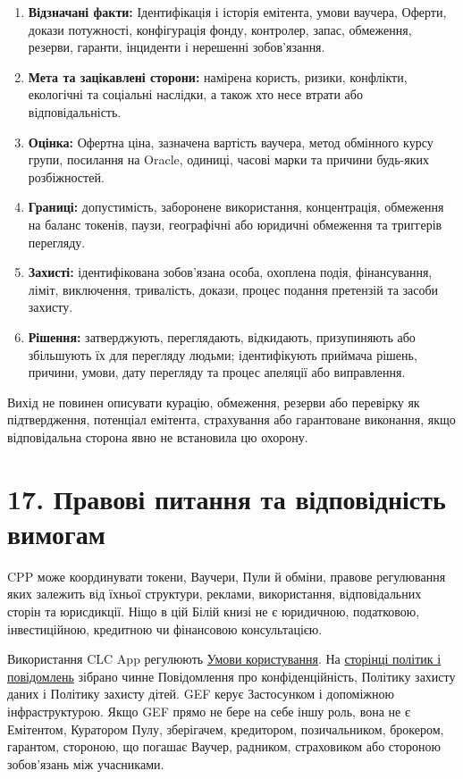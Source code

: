 \documentclass[11pt]{article}
\begin{document}
\begin{enumerate}[leftmargin=*]
\item \textbf{Відзначані факти:} Ідентифікація і історія емітента, умови ваучера, Оферти, докази потужності, конфігурація фонду, контролер, запас, обмеження, резерви, гаранти, інциденти і нерешенні зобов'язання.
\item \textbf{Мета та зацікавлені сторони:} намірена користь, ризики, конфлікти, екологічні та соціальні наслідки, а також хто несе втрати або відповідальність.
\item \textbf{Оцінка:} Офертна ціна, зазначена вартість ваучера, метод обмінного курсу групи, посилання на Oracle, одиниці, часові марки та причини будь-яких розбіжностей.
\item \textbf{Границі:} допустимість, заборонене використання, концентрація, обмеження на баланс токенів, паузи, географічні або юридичні обмеження та триггерів перегляду.
\item \textbf{Захисті:} ідентифікована зобов'язана особа, охоплена подія, фінансування, ліміт, виключення, тривалість, докази, процес подання претензій та засоби захисту.
\item \textbf{Рішення:} затверджують, переглядають, відкидають, призупиняють або збільшують їх для перегляду людьми; ідентифікують приймача рішень, причини, умови, дату перегляду та процес апеляції або виправлення.
\end{enumerate}
Вихід не повинен описувати курацію, обмеження, резерви або перевірку як підтвердження, потенціал емітента, страхування або гарантоване виконання, якщо відповідальна сторона явно не встановила цю охорону.


\section*{17. Правові питання та відповідність вимогам}

CPP може координувати токени, Ваучери, Пули й обміни, правове регулювання яких залежить від їхньої структури, реклами, використання, відповідальних сторін та юрисдикції. Ніщо в цій Білій книзі не є юридичною, податковою, інвестиційною, кредитною чи фінансовою консультацією.

Використання CLC App регулюють \href{https://docs.cosmolocal.credit/uk/governance/terms}{Умови користування}. На \href{https://docs.cosmolocal.credit/uk/governance/policies}{сторінці політик і повідомлень} зібрано чинне Повідомлення про конфіденційність, Політику захисту даних і Політику захисту дітей. GEF керує Застосунком і допоміжною інфраструктурою. Якщо GEF прямо не бере на себе іншу роль, вона не є Емітентом, Куратором Пулу, зберігачем, кредитором, позичальником, брокером, гарантом, стороною, що погашає Ваучер, радником, страховиком або стороною зобов'язань між учасниками.
\end{document}
